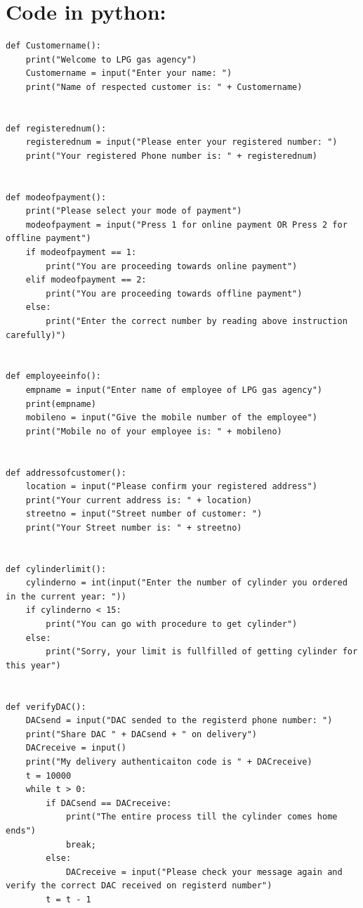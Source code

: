 \documentclass{article}
\begin{document}
{\section{Code in python:}
\begin{lstlisting}
def Customername():
    print("Welcome to LPG gas agency")
    Customername = input("Enter your name: ")
    print("Name of respected customer is: " + Customername)


def registerednum():
    registerednum = input("Please enter your registered number: ")
    print("Your registered Phone number is: " + registerednum)


def modeofpayment():
    print("Please select your mode of payment")
    modeofpayment = input("Press 1 for online payment OR Press 2 for offline payment")
    if modeofpayment == 1:
        print("You are proceeding towards online payment")
    elif modeofpayment == 2:
        print("You are proceeding towards offline payment")
    else:
        print("Enter the correct number by reading above instruction carefully)")


def employeeinfo():
    empname = input("Enter name of employee of LPG gas agency")
    print(empname)
    mobileno = input("Give the mobile number of the employee")
    print("Mobile no of your employee is: " + mobileno)


def addressofcustomer():
    location = input("Please confirm your registered address")
    print("Your current address is: " + location)
    streetno = input("Street number of customer: ")
    print("Your Street number is: " + streetno)


def cylinderlimit():
    cylinderno = int(input("Enter the number of cylinder you ordered in the current year: "))
    if cylinderno < 15:
        print("You can go with procedure to get cylinder")
    else:
        print("Sorry, your limit is fullfilled of getting cylinder for this year")


def verifyDAC():
    DACsend = input("DAC sended to the registerd phone number: ")
    print("Share DAC " + DACsend + " on delivery")
    DACreceive = input()
    print("My delivery authenticaiton code is " + DACreceive)
    t = 10000
    while t > 0:
        if DACsend == DACreceive:
            print("The entire process till the cylinder comes home ends")
            break;
        else:
            DACreceive = input("Please check your message again and verify the correct DAC received on registerd number")
        t = t - 1



\end{lstlisting}}
\end{document}
